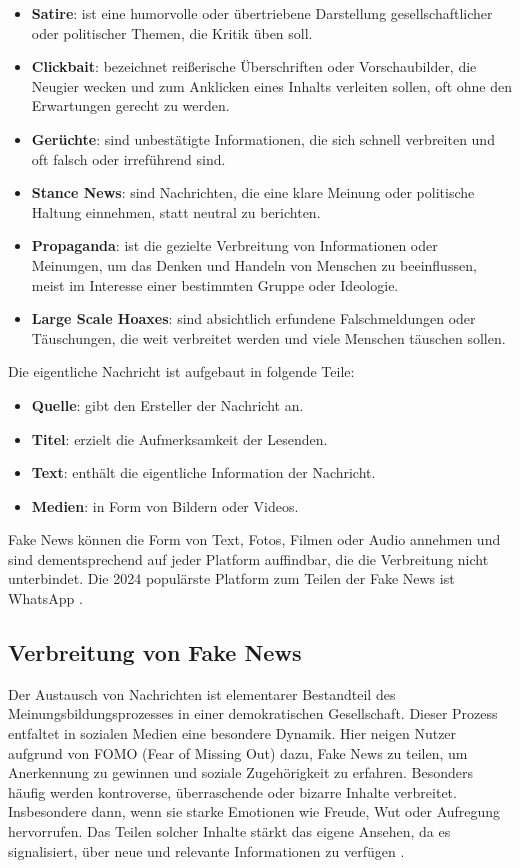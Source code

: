 \begin{itemize}
    \item \textbf{Satire}: ist eine humorvolle oder übertriebene Darstellung gesellschaftlicher oder politischer Themen, die Kritik üben soll.
    \item \textbf{Clickbait}: bezeichnet reißerische Überschriften oder Vorschaubilder, die Neugier wecken und zum Anklicken eines Inhalts verleiten sollen, oft ohne den Erwartungen gerecht zu werden.
    \item \textbf{Gerüchte}: sind unbestätigte Informationen, die sich schnell verbreiten und oft falsch oder irreführend sind.
    \item \textbf{Stance News}: sind Nachrichten, die eine klare Meinung oder politische Haltung einnehmen, statt neutral zu berichten.
    \item \textbf{Propaganda}: ist die gezielte Verbreitung von Informationen oder Meinungen, um das Denken und Handeln von Menschen zu beeinflussen, meist im Interesse einer bestimmten Gruppe oder Ideologie.
    \item \textbf{Large Scale Hoaxes}: sind absichtlich erfundene Falschmeldungen oder Täuschungen, die weit verbreitet werden und viele Menschen täuschen sollen.
\end{itemize}

Die eigentliche Nachricht ist aufgebaut in folgende Teile:

\begin{itemize}
    \item \textbf{Quelle}: gibt den Ersteller der Nachricht an.
    \item \textbf{Titel}: erzielt die Aufmerksamkeit der Lesenden.
    \item \textbf{Text}: enthält die eigentliche Information der Nachricht.
    \item \textbf{Medien}: in Form von Bildern oder Videos.
\end{itemize}

Fake News können die Form von Text, Fotos, Filmen oder Audio annehmen und sind dementsprechend auf jeder Platform auffindbar, 
die die Verbreitung nicht unterbindet. Die 2024 populärste Platform zum Teilen der Fake News ist WhatsApp \cite{Ashish2024}.

\subsection{Verbreitung von Fake News}

Der Austausch von Nachrichten ist elementarer Bestandteil des Meinungsbildungsprozesses in einer demokratischen Gesellschaft. 
Dieser Prozess entfaltet in sozialen Medien eine besondere Dynamik. 
Hier neigen Nutzer aufgrund von FOMO (Fear of Missing Out) dazu, Fake News zu teilen, um Anerkennung zu gewinnen und soziale Zugehörigkeit zu erfahren. 
Besonders häufig werden kontroverse, überraschende oder bizarre Inhalte verbreitet. Insbesondere dann, wenn sie starke Emotionen wie Freude, Wut oder Aufregung hervorrufen. 
Das Teilen solcher Inhalte stärkt das eigene Ansehen, da es signalisiert, über neue und relevante Informationen zu verfügen \cite{socsci9100185}.

